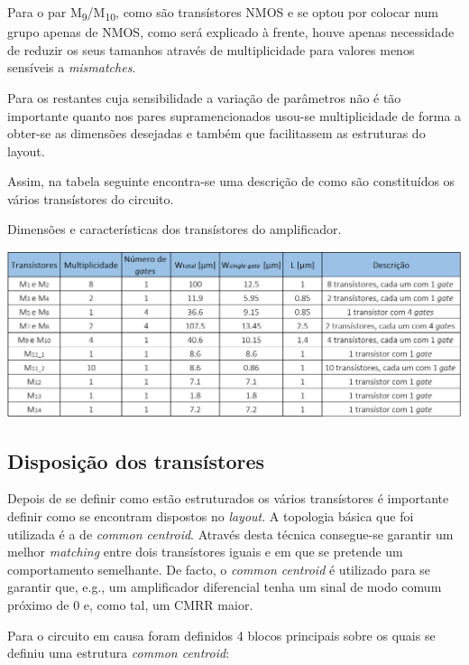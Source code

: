 \documentclass[11pt]{article}
\numberwithin{equation}{section}
\begin{document}
Para o par M\textsubscript{9}/M\textsubscript{10}, como são transístores NMOS e se optou por colocar num grupo apenas de NMOS, como será explicado à frente, houve apenas necessidade de reduzir os seus tamanhos através de multiplicidade para valores menos sensíveis a \textit{mismatches}.

Para os restantes cuja sensibilidade a variação de parâmetros não é tão importante quanto nos pares supramencionados usou-se multiplicidade de forma a obter-se as dimensões desejadas e também que facilitassem as estruturas do layout.

Assim, na tabela seguinte encontra-se uma descrição de como são constituídos os vários transístores do circuito.

\begin{table}[H]
	\centering
	\caption{Dimensões e características dos transístores do amplificador.}
	\vspace{-1.5mm}
	\includegraphics[keepaspectratio=true, scale=0.30]{teoricas/dimensoes2}
\end{table}

\subsection{Disposição dos transístores}

Depois de se definir como estão estruturados os vários transístores é importante definir como se encontram dispostos no \textit{layout}. A topologia básica que foi utilizada é a de \textit{common centroid}. Através desta técnica consegue-se garantir um melhor \textit{matching} entre dois transístores iguais e em que se pretende um comportamento semelhante. De facto, o \textit{common centroid} é utilizado para se garantir que, e.g., um amplificador diferencial tenha um sinal de modo comum próximo de 0 e, como tal, um CMRR maior.

Para o circuito em causa foram definidos 4 blocos principais sobre os quais se definiu uma estrutura \textit{common centroid}:
\end{document}
